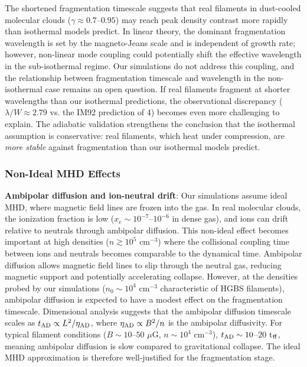 \documentclass[twoside,twocolumn]{mnras}
\begin{document}
The shortened fragmentation timescale suggests that real filaments in dust-cooled molecular clouds ($\gamma \approx 0.7$--$0.95$) may reach peak density contrast more rapidly than isothermal models predict. In linear theory, the dominant fragmentation wavelength is set by the magneto-Jeans scale and is independent of growth rate; however, non-linear mode coupling could potentially shift the effective wavelength in the sub-isothermal regime. Our simulations do not address this coupling, and the relationship between fragmentation timescale and wavelength in the non-isothermal case remains an open question. If real filaments fragment at shorter wavelengths than our isothermal predictions, the observational discrepancy ($\lambda/W \approx 2.79$ vs. the IM92 prediction of 4) becomes even more challenging to explain. The adiabatic validation strengthens the conclusion that the isothermal assumption is conservative: real filaments, which heat under compression, are {\it more stable} against fragmentation than our isothermal models predict.

\subsubsection{Non-Ideal MHD Effects}

\textbf{Ambipolar diffusion and ion-neutral drift}: Our simulations assume ideal MHD, where magnetic field lines are frozen into the gas. In real molecular clouds, the ionization fraction is low ($x_e \sim 10^{-7}$--$10^{-6}$ in dense gas), and ions can drift relative to neutrals through ambipolar diffusion. This non-ideal effect becomes important at high densities ($n \gtrsim 10^5$ cm$^{-3}$) where the collisional coupling time between ions and neutrals becomes comparable to the dynamical time. Ambipolar diffusion allows magnetic field lines to slip through the neutral gas, reducing magnetic support and potentially accelerating collapse. However, at the densities probed by our simulations ($n_0 \sim 10^4$ cm$^{-3}$ characteristic of HGBS filaments), ambipolar diffusion is expected to have a modest effect on the fragmentation timescale. Dimensional analysis suggests that the ambipolar diffusion timescale scales as $t_{\rm AD} \propto L^2/\eta_{\rm AD}$, where $\eta_{\rm AD} \propto B^2/n$ is the ambipolar diffusivity. For typical filament conditions ($B \sim 10$--$50$ $\mu$G, $n \sim 10^4$ cm$^{-3}$), $t_{\rm AD} \sim 10$--$20$ t$_{\rm ff}$, meaning ambipolar diffusion is slow compared to gravitational collapse. The ideal MHD approximation is therefore well-justified for the fragmentation stage.
\end{document}
